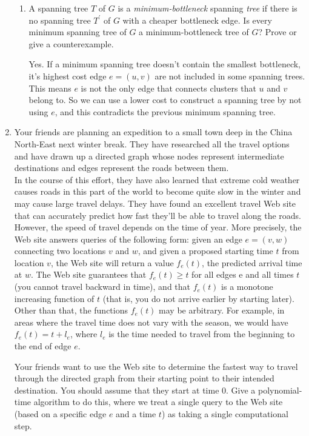 \documentclass[14pt, a4paper]{article}
\begin{document}
\begin{enumerate}
\begin{enumerate}[label*=\arabic*]
    \item A spanning tree $T$ of $G$ is a \textit{minimum-bottleneck} 
    spanning \textit{tree} if there is no spanning tree $T^{\prime}$ of $G$ 
    with a cheaper bottleneck edge. Is every minimum spanning tree of $G$ 
    a minimum-bottleneck tree of $G$? Prove or give a counterexample. 
    
    Yes. If a minimum spanning tree doesn't contain the smallest bottleneck, it's highest cost edge $e = (u, v)$ 
    are not included in some spanning trees. This means $e$ is not the only edge that connects 
    clusters that $u$ and $v$ belong to. So we can use a lower cost to construct a spanning tree by not 
    using $e$, and this contradicts the previous minimum spanning tree.
    \end{enumerate}
    
\item Your friends are planning an expedition to a small town deep in the China North-East next winter break. They have researched all the travel options and have drawn up a directed graph whose nodes represent intermediate destinations and edges represent the roads between them.\\

In the course of this effort, they have also learned that extreme cold weather causes roads in this part of the world to become quite slow in the winter and may cause large travel delays. They have found an excellent travel Web site that can accurately predict how fast they’ll be able to travel along the roads. However, the speed of travel depends on the time of year. More precisely, the Web site answers queries of the following form: given an edge $e = (v, w)$ connecting two locations $v$ and $w$, and given a proposed starting time $t$ from location $v$, the Web site will return a value $f_e(t)$, the predicted arrival time at $w$. The Web site guarantees that $f_e(t) \ge t$ for all edges e and all times $t$ (you cannot travel backward in time), and that $f_e(t)$ is a monotone increasing function of $t$ (that is, you do not arrive earlier by starting later). Other than that, the functions $f_e(t)$ may be arbitrary. For example, in areas where the travel time does not vary with the season, we would have $f_e(t) = t + l_e$, where $l_e$ is the time needed to travel from the beginning to the end of edge $e$.

Your friends want to use the Web site to determine the fastest way to travel through the directed graph from their starting point to their intended destination. You should assume that they start at time 0. Give a polynomial-time algorithm to do this, where we treat a single query to the Web site (based on a specific edge $e$ and a time $t$) as taking a single computational step.


\end{enumerate}
\end{document}
